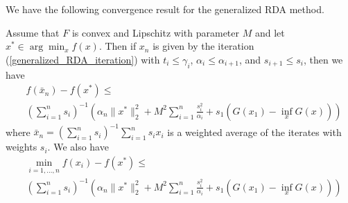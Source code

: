 We have the following convergence result for the generalized RDA method.
\begin{theorem}
 Assume that $F$ is convex and Lipschitz with parameter $M$ and let $x^*\in \arg\min_x f(x)$. 
 Then if $x_n$ is given by the iteration (\ref{generalized_RDA_iteration})
 with $t_i\leq \gamma_i$, $\alpha_i\leq \alpha_{i+1}$, and $s_{i+1}\leq s_i$, then we have
 \begin{align}
  &f(\bar{x}_n) - f(x^*) \leq \\
  &\left(\displaystyle\sum_{i = 1}^n s_i\right)^{-1} \left(\alpha_n\|x^*\|_2^2 + M^2\displaystyle\sum_{i = 1}^n \frac{s_i^2}{\alpha_i} + s_1(G(x_1) - \inf_x G(x))\right)
 \end{align}
 where $\bar{x}_n = (\sum_{i = 1}^n s_i)^{-1}\sum_{i = 1}^n s_ix_i$ is a weighted average of the iterates with weights $s_i$.
 We also have
 \begin{align}
  &\min_{i = 1,...,n} f(x_i) - f(x^*) \leq \\
  &\left(\displaystyle\sum_{i = 1}^n s_i\right)^{-1}\left(\alpha_n\|x^*\|_2^2 + M^2\displaystyle\sum_{i = 1}^n \frac{s_i^2}{\alpha_i} + s_1(G(x_1) - \inf_x G(x))\right)
 \end{align}
\end{theorem}

